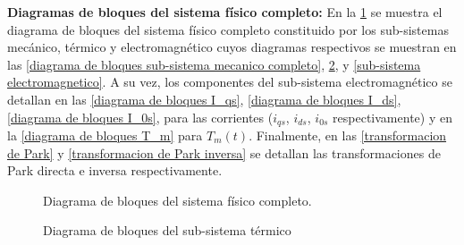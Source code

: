 \documentclass[a4paper, 10pt, onecolumn,journal]{ieeeconf}
\begin{document}
\textbf{Diagramas de bloques del sistema físico completo: } En la \cref{diagrama de bloques del sistema fisico} se muestra
el diagrama de bloques del sistema físico completo constituido por los sub-sistemas mecánico, térmico y electromagnético cuyos diagramas
respectivos se muestran en las \cref{diagrama de bloques sub-sistema mecanico completo}, \cref{subsistema termico},
y \cref{sub-sistema electromagnetico}. A su vez, los componentes del sub-sistema electromagnético se detallan
en las \cref{diagrama de bloques I_qs}, \cref{diagrama de bloques I_ds}, \cref{diagrama de bloques I_0s}, para las corrientes ($i_{qs}$, $i_{ds}$, $i_{0s}$ respectivamente) y en la \cref{diagrama de bloques T_m} para $T_m(t)$.
Finalmente, en las \cref{transformacion de Park} y \cref{transformacion de Park inversa} se detallan las transformaciones de Park directa e inversa respectivamente.

\begin{figure}[thpb]
    \centering
    \begin{adjustbox}{max width=\columnwidth}
    \end{adjustbox}
    \caption{Diagrama de bloques del sistema físico completo.}
    \label{diagrama de bloques del sistema fisico}
\end{figure}

\begin{figure}[thpb]
    \centering
    \begin{adjustbox}{max width=\columnwidth}
    \end{adjustbox}
    \caption{Diagrama de bloques del sub-sistema térmico}
    \label{subsistema termico}
\end{figure}
\end{document}
